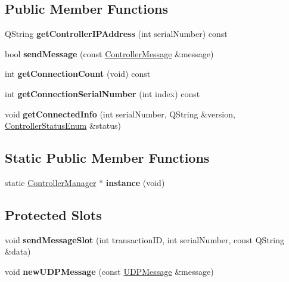 \subsection*{Public Member Functions}
\begin{DoxyCompactItemize}
\item 
\mbox{\label{class_controller_manager_a1067bf5f3c96c9fa1ec977f4405a9fa1}} 
Q\+String {\bfseries get\+Controller\+I\+P\+Address} (int serial\+Number) const
\item 
\mbox{\label{class_controller_manager_acf4065fd6115b3ee3bbb0ad4f57a64b9}} 
bool {\bfseries send\+Message} (const \hyperlink{class_controller_message}{Controller\+Message} \&message)
\item 
\mbox{\label{class_controller_manager_ae195bc494eb3d3afeabc4e71471497d3}} 
int {\bfseries get\+Connection\+Count} (void) const
\item 
\mbox{\label{class_controller_manager_a1cc2f2da0ea22cc2a19138c0cb91ada5}} 
int {\bfseries get\+Connection\+Serial\+Number} (int index) const
\item 
\mbox{\label{class_controller_manager_a4e076c28025a9601dd7617672567b0a7}} 
void {\bfseries get\+Connected\+Info} (int serial\+Number, Q\+String \&version, \hyperlink{_global_defs_8h_a51207b6a49e0da6f9978a3019d93480a}{Controller\+Status\+Enum} \&status)
\end{DoxyCompactItemize}
\subsection*{Static Public Member Functions}
\begin{DoxyCompactItemize}
\item 
\mbox{\label{class_controller_manager_a3f4999812436ab587f8ec2ee11128c51}} 
static \hyperlink{class_controller_manager}{Controller\+Manager} $\ast$ {\bfseries instance} (void)
\end{DoxyCompactItemize}
\subsection*{Protected Slots}
\begin{DoxyCompactItemize}
\item 
\mbox{\label{class_controller_manager_a0cd8a0eeb3356aa636f084e6aba8a22b}} 
void {\bfseries send\+Message\+Slot} (int transaction\+ID, int serial\+Number, const Q\+String \&data)
\item 
\mbox{\label{class_controller_manager_a5e9480ad4b88ff536ab60dbc9cb6619f}} 
void {\bfseries new\+U\+D\+P\+Message} (const \hyperlink{class_u_d_p_message}{U\+D\+P\+Message} \&message)
\end{DoxyCompactItemize}


